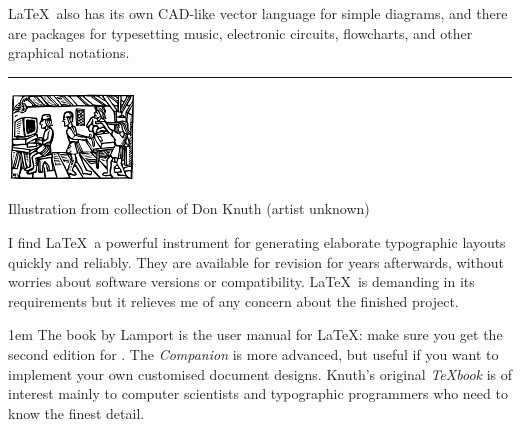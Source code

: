 \documentclass[fleqn]{article}
\begin{document}
\begin{multicols}{3}
\LaTeX\ also has its own CAD-like vector language for simple diagrams,
and there are packages for typesetting music, electronic circuits,
flowcharts, and other graphical notations.

\end{multicols}

\hrule

\begin{multicols}{2}

\begin{multicols}{2}\parskip0pt\parindent0pt
\sffamily\lite{}\selectfont
\includegraphics[width=\columnwidth]{typo-degraded}
\par{\flushright\tiny
Illustration from collection of Don Knuth (artist
unknown)\par}
\columnbreak
I find \LaTeX\ a powerful instrument for generating elaborate
typographic layouts quickly and reliably. They are available for
revision for years afterwards, without worries about software versions
or compatibility. \LaTeX\ is demanding in its requirements but it
relieves me of any concern about the finished project.\par
{}
\end{multicols}

\renewcommand{\refname}{Documentation}
\nocite{*}
\begin{Sbox}\begin{minipage}{.9\columnwidth}
\scriptsize
\makeatletter\let\@apabi\bibitem\def\bibitem{\vspace*{-.5\baselineskip}\@apabi}%


\parskip0pt\parindent1em
The book by Lamport is the user manual for \LaTeX: make sure you get
the second edition for \LaTeXe. The \textit{Companion} is more
advanced, but useful if you want to implement your own customised
document designs. Knuth's original \textit{\TeX book} is of interest
mainly to computer scientists and typographic programmers who need to
know the finest detail.


\end{minipage}
\end{Sbox}
\end{multicols}
\end{document}
